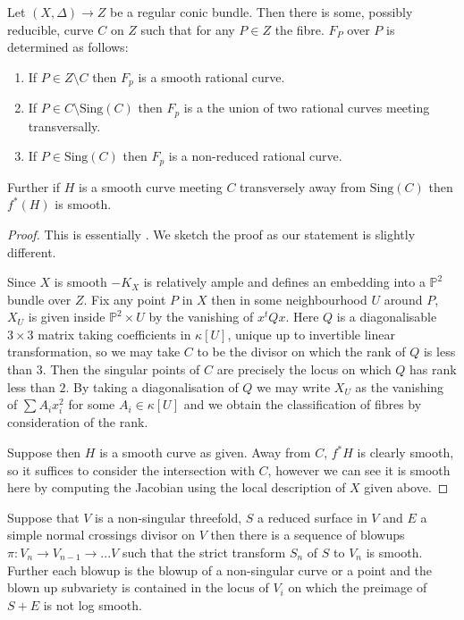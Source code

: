 \documentclass[a4paper,12pt]{book}
\newcommand{\Sing}{\text{Sing}}
\begin{document}
\begin{lemma}
	Let $(X,\Delta) \to Z$ be a regular conic bundle. Then there is some, possibly reducible, curve $C$ on $Z$ such that for any $P \in Z$ the fibre. $F_{P}$ over $P$ is determined as follows:
	\begin{enumerate}
		\item If $P \in Z\setminus C$ then $F_{p}$ is a smooth rational curve.
		\item If $P \in C\setminus \Sing(C)$ then $F_{p}$ is a the union of two rational curves meeting transversally.
		\item If $P \in \Sing(C)$ then $F_{p}$ is a non-reduced rational curve.
	\end{enumerate}
	Further if $H$ is a smooth curve meeting $C$ transversely away from $\Sing(C)$ then $f^{*}(H)$ is smooth.
\end{lemma}
\begin{proof}
	This is essentially \cite[Proposition 1.8]{sarkisov1983conic}. We sketch the proof as our statement is slightly different.
	
	Since $X$ is smooth $-K_{X}$ is relatively ample and defines an embedding into a $\mathbb{P}^{2}$ bundle over $Z$.
	Fix any point $P$ in $X$ then in some neighbourhood $U$ around $P$, $X_{U}$ is given inside $\mathbb{P}^{2} \times U$ by the vanishing of $x^{t}Qx$. Here $Q$ is a diagonalisable $3\times 3$ matrix taking coefficients in $\kappa[U]$, unique up to invertible linear transformation, so we may take $C$ to be the divisor on which the rank of $Q$ is less than $3$. Then the singular points of $C$ are precisely the locus on which $Q$ has rank less than $2$. By taking a diagonalisation of $Q$ we may write $X_{U}$ as the vanishing of $\sum A_{i}x_{i}^{2}$ for some $A_{i} \in \kappa[U]$ and we obtain the classification of fibres by consideration of the rank.
	
	Suppose then $H$ is a smooth curve as given. Away from $C$, $f^{*}H$ is clearly smooth, so it suffices to consider the intersection with $C$, however we can see it is smooth here by computing the Jacobian using the local description of $X$ given above. 
\end{proof}


\begin{theorem}\cite[Theorem 1.2]{cutkosky2009resolution}
	Suppose that $V$ is a non-singular threefold, $S$ a reduced surface in $V$ and $E$ a simple normal crossings divisor on $V$ then there is a sequence of blowups $\pi\colon V_{n} \to V_{n-1} \to ... V$ such that the strict transform $S_{n}$ of $S$ to $V_{n}$ is smooth. Further each blowup is the blowup of a non-singular curve or a point and the blown up subvariety is contained in the locus of $V_{i}$ on which the preimage of $S+E$ is not log smooth.
\end{theorem}
\end{document}
